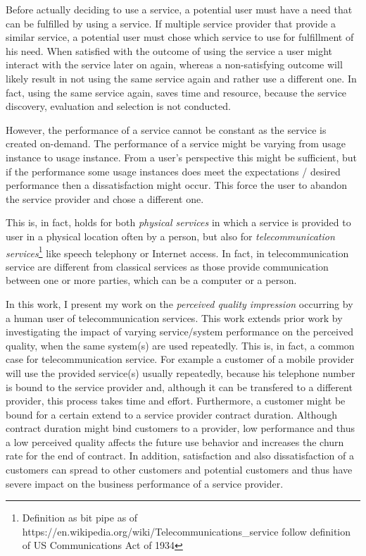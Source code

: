 Before actually deciding to use a service, a potential user must have a need that can be fulfilled by using a service. %
If multiple service provider that provide a similar service, a potential user must chose which service to use for fulfillment of his need.
When satisfied with the outcome of using the service a user might interact with the service later on again, whereas a non-satisfying outcome will likely result in not using the same service again and rather use a different one.
In fact, using the same service again, saves time and resource, because the service discovery, evaluation and selection is not conducted.

However, the performance of a service cannot be constant as the service is created on-demand.
The performance of a service might be varying from usage instance to usage instance.
From a user's perspective this might be sufficient, but if the performance some usage instances does meet the expectations / desired performance then a dissatisfaction might occur.
This force the user to abandon the service provider and chose a different one.

This is, in fact, holds for both \emph{physical services} in which a service is provided to user in a physical location often by a person, but also for \emph{telecommunication services}\footnote{Definition as bit pipe as of https://en.wikipedia.org/wiki/Telecommunications_service follow definition of US Communications Act of 1934} like speech telephony or Internet access.
In fact, in telecommunication service are different from classical services as those provide communication between one or more parties, which can be a computer or a person.

In this work, I present my work on the \emph{perceived quality impression} occurring by a human user of telecommunication services.
This work extends prior work by investigating the impact of varying service/system performance on the perceived quality, when the same system(s) are used repeatedly.
This is, in fact, a common case for telecommunication service.
For example a customer of a mobile  provider will use the provided service(s) usually repeatedly, because his telephone number is bound to the service provider and, although it can be transfered to a different provider, this process takes time and effort.
Furthermore, a customer might be bound for a certain extend to a service provider contract duration.
Although contract duration might bind customers to a provider, low performance and thus a low perceived quality affects the future use behavior and increases the churn rate for the end of contract.
In addition, satisfaction and also dissatisfaction of a customers can spread to other customers and potential customers and thus have severe impact on the business performance of a service provider.

